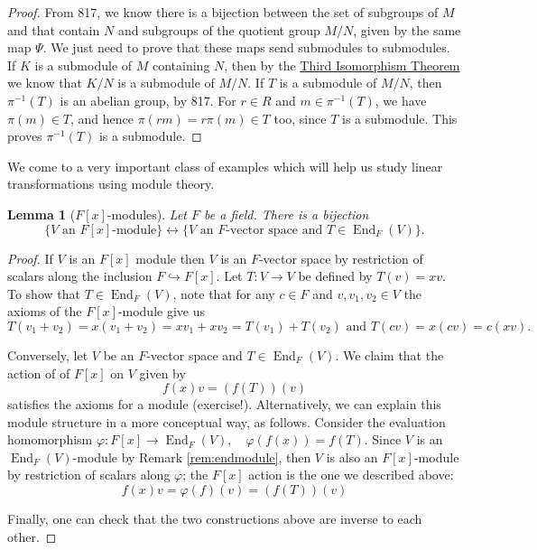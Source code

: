 \documentclass[12pt]{report}
\newtheorem{lemma}[theorem]{Lemma}
\numberwithin{equation}{section}
\numberwithin{theorem}{chapter}
\theoremstyle{definition}
\newtheorem*{basic properties}{Basic Properties}
\newtheorem*{Important Remark}{Important Remark}
\DeclareMathOperator{\End}{End}
\begin{document}
\begin{proof}
From 817, we know there is a bijection between the set of subgroups of $M$ and that contain $N$ and subgroups of the quotient group $M/N$, given by the same map $\Psi$.
We just need to prove that these maps send submodules to submodules.
If $K$ is a submodule of $M$ containing $N$, then by the \hyperref[third iso thm]{Third Isomorphism Theorem} we know that $K/N$ is a submodule of $M/N$.
If $T$ is a submodule of $M/N$, then $\pi^{-1}(T)$ is an abelian group, by 817. For $r \in R$ and $m \in \pi^{-1}(T)$, we have $\pi(m) \in T$, and hence $\pi(rm) = r\pi(m) \in T$ too, since $T$ is a submodule. This proves $\pi^{-1}(T)$ is a submodule.
\end{proof}



We come to a very important class of examples which will help us study linear transformations using module theory.

\begin{lemma}[{$F[x]$-modules}]\label{F[x]mod}
Let $F$ be a field. There is a bijection
$$\{V \text{ an } F[x]\text{-module}\} \longleftrightarrow \{ V \text{ an } F\text{-vector space and }T\in \End_F(V)\}.$$
\end{lemma}

\begin{proof}
If $V$ is an $F[x]$ module then $V$ is an $F$-vector space by restriction of scalars along the inclusion $F \hookrightarrow F[x]$. Let $T:V\to V$ be defined by $T(v)=xv$. To show that $T\in \End_F(V)$, note that for any $c\in F$ and $v,v_1, v_2\in V$ the axioms of the $F[x]$-module give us
$$T(v_1+v_2)=x(v_1+v_2)=xv_1+xv_2=T(v_1)+T(v_2) \textrm{  
and } T(cv)=x(cv)=c(xv).$$

Conversely, let $V$ be an $F$-vector space and $T\in \End_F(V)$. We claim that the action of of $F[x]$ on $V$ given by 
$$f(x)v=(f(T))(v)$$
satisfies the axioms for a module (exercise!). Alternatively, we can explain this module structure in a more conceptual way, as follows. Consider the evaluation homomorphism $\varphi:F[x]\to \End_F(V), \quad \varphi(f(x))=f(T)$. Since $V$ is an  $\End_F(V)$-module by Remark \ref{rem:endmodule}, then $V$ is also an $F[x]$-module by restriction of scalars along $\varphi$; the $F[x]$ action is the one we described above:
$$f(x)v= \varphi(f)(v) = (f(T))(v)$$

Finally, one can check that the two constructions above are inverse to each other.
\end{proof}
\end{document}
